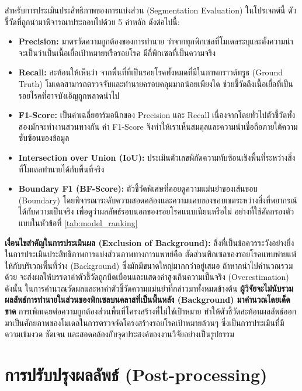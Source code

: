 สำหรับการประเมินประสิทธิภาพของการแบ่งส่วน (Segmentation Evaluation) ในโปรเจกต์นี้ ตัวชี้วัดที่ถูกนำมาพิจารณาประกอบไปด้วย 5 ค่าหลัก ดังต่อไปนี้:
\begin{itemize}
    \item \textbf{Precision:} มาตรวัดความถูกต้องของการทำนาย ว่าจากทุกพิกเซลที่โมเดลระบุและตั้งความน่าจะเป็นว่าเป็นเนื้อเยื่อเป้าหมายหรือรอยโรค มีกี่พิกเซลที่เป็นความจริง
    \item \textbf{Recall:} สะท้อนให้เห็นว่า จากพื้นที่ที่เป็นรอยโรคทั้งหมดที่มีในภาพกราวด์ทรูธ (Ground Truth) โมเดลสามารถตรวจจับและทำนายครอบคลุมมากน้อยเพียงใด ช่วยชี้วัดถึงเนื้อเยื่อที่เป็นรอยโรคที่อาจบังเอิญถูกพลาดนำไป
    \item \textbf{F1-Score:} เป็นค่าเฉลี่ยฮาร์มอนิกของ Precision และ Recall เนื่องจากโดยทั่วไปตัวชี้วัดทั้งสองมักจะทำงานสวนทางกัน ค่า F1-Score จึงทำให้เราเห็นสมดุลและความน่าเชื่อถือภายใต้ความซับซ้อนของข้อมูล
    \item \textbf{Intersection over Union (IoU):} ประเมินตัวเลขพิกัดความทับซ้อนเชิงพื้นที่ระหว่างสิ่งที่โมเดลทำนายได้กับพื้นที่จริง
    \item \textbf{Boundary F1 (BF-Score):} ตัวชี้วัดพิเศษที่คอยดูความแม่นยำของเส้นขอบ (Boundary) โดยพิจารณาระดับความสอดคล้องและความแคบของขอบเขตระหว่างสิ่งที่พยากรณ์ได้กับความเป็นจริง เพื่อดูว่าผลลัพธ์รอบนอกของรอยโรคแนบเนียนหรือไม่ อย่างที่ใช้คัดกรองตัวแบบในหัวข้อที่ \ref{tab:model_ranking} 
\end{itemize}

\textbf{เงื่อนไขสำคัญในการประเมินผล (Exclusion of Background):}
สิ่งที่เป็นข้อควรระวังอย่างยิ่งในการประเมินประสิทธิภาพการแบ่งส่วนภาพทางการแพทย์คือ สัดส่วนพิกเซลของรอยโรคแทบพ่ายแพ้ให้กับบริเวณพื้นที่ว่าง (Background) ซึ่งมักมีขนาดใหญ่มากกว่าอยู่เสมอ ถ้าหากนำไปคำนวณรวมด้วย จะส่งผลให้บรรดาค่าตัวชี้วัดถูกบิดเบือนและแสดงค่าสูงเกินความเป็นจริง (Overestimation) ดังนั้น ในการคำนวณวัดผลและหาค่าตัวชี้วัดความแม่นยำที่กล่าวมาทั้งหมดข้างต้น \textbf{ผู้วิจัยจะไม่นับรวมผลลัพธ์การทำนายในส่วนของพิกเซลบนคลาสที่เป็นพื้นหลัง (Background) มาคำนวณโดยเด็ดขาด} การเพิกเฉยต่อความถูกต้องส่วนพื้นที่โครงสร้างที่ไม่ใช่เป้าหมาย ทำให้ตัวชี้วัดสะท้อนผลลัพธ์ออกมาเป็นศักยภาพของโมเดลในการตรวจจัดโครงสร้างรอยโรคเป้าหมายล้วนๆ ซึ่งเป็นการประเมินที่มีความเข้มงวด ชัดเจน และสอดคล้องกับจุดประสงค์ของงานวิจัยอย่างเป็นรูปธรรม



\section{การปรับปรุงผลลัพธ์ (Post-processing)}

